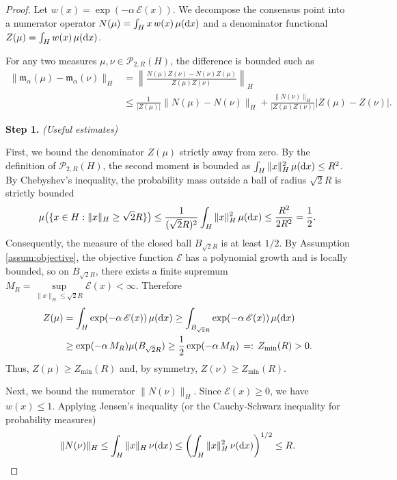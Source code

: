 \documentclass[12pt]{amsart}
\newcommand{\D}[1]{\mbox{\rm #1}}
\newcommand{\dd}{\D{d}}
\numberwithin{equation}{section}
\begin{document}
\begin{proof}
Let $w(x) = \exp(-\alpha \, \mathscr{E}(x))$. We decompose the consensus point into a numerator operator $N(\mu) = \int_H x\, w(x)\, \mu(\dd x)$ and a denominator functional $Z(\mu) = \int_H w(x)\, \mu(\dd x)$. 

For any two measures $\mu, \nu \in \mathscr{P}_{2,R}(H)$, the difference is bounded such as
\begin{align}
    \label{eq:m_diff_bound_R}
    \|\mathfrak{m}_{\alpha}(\mu) - \mathfrak{m}_{\alpha}(\nu)\|_H &= \left\| \frac{N(\mu)Z(\nu) - N(\nu)Z(\mu)}{Z(\mu)Z(\nu)} \right\|_H \nonumber \\
    &\leq \frac{1}{|Z(\mu)|} \|N(\mu) - N(\nu)\|_H + \frac{\|N(\nu)\|_H}{|Z(\mu)Z(\nu)|} |Z(\mu) - Z(\nu)|.
\end{align}

\textbf{Step 1.} \textit{(Useful estimates)}

First, we bound the denominator $Z(\mu)$ strictly away from zero. By the definition of $\mathscr{P}_{2,R}(H)$, the second moment is bounded as $\int_H \|x\|_H^2\, \mu(\dd x) \leq R^2$. By Chebyshev's inequality, the probability mass outside a ball of radius $\sqrt{2}R$ is strictly bounded
\begin{equation*}
    \mu\big(\{x \in H : \|x\|_H \geq \sqrt{2}R\}\big) \leq \frac{1}{(\sqrt{2}R)^2} \int_H \|x\|_H^2 \,\mu(\dd x) \leq \frac{R^2}{2R^2} = \frac{1}{2}.
\end{equation*}
Consequently, the measure of the closed ball $B_{\sqrt{2}R}$ is at least $1/2$. By Assumption \ref{assum:objective}, the objective function $\mathscr{E}$ has a polynomial growth and is locally bounded, so on $B_{\sqrt{2}R}$, there exists a finite supremum $M_R = \sup\limits_{\|x\|_H \leq \sqrt{2}R} \mathscr{E}(x) < \infty$. Therefore
\begin{equation}
\label{eq:lowerbound Z}
\begin{aligned}
    Z(\mu) &= \int_H \exp(-\alpha \,\mathscr{E}(x))\, \mu(\dd x) \geq \int_{B_{\sqrt{2}R}} \exp(-\alpha\, \mathscr{E}(x))\, \mu(\dd x) \\
    &\geq \exp(-\alpha\, M_R) \mu(B_{\sqrt{2}R}) \geq \frac{1}{2} \exp(-\alpha\, M_R) \, =: \, Z_{\min}(R)>0.
\end{aligned}
\end{equation} 
Thus, $Z(\mu) \geq Z_{\min}(R)$ and, by symmetry, $Z(\nu) \geq Z_{\min}(R)$.

Next, we bound the numerator $\|N(\nu)\|_H$. Since $\mathscr{E}(x) \geq 0$, we have $w(x) \leq 1$. Applying Jensen's inequality (or the Cauchy-Schwarz inequality for probability measures)
\begin{equation*}
    \|N(\nu)\|_H \leq \int_H \|x\|_H\, \nu(\dd x) \leq \left( \int_H \|x\|_H^2 \,\nu(\dd x) \right)^{1/2} \leq R.
\end{equation*}


\end{proof}
\end{document}

